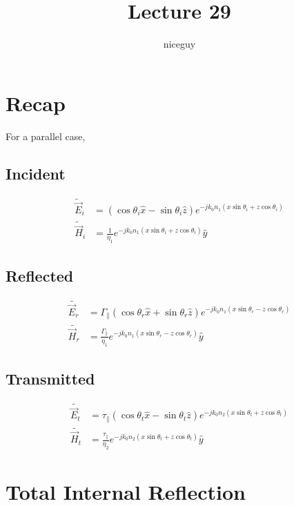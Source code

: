 \documentclass[12pt]{article}
\title{Lecture 29}
\author{niceguy}
\begin{document}
\maketitle

\section{Recap}

For a parallel case,

\subsection{Incident}

\begin{align*}
    \tilde{\vec E}_i &= (\cos\theta_i\hat x - \sin\theta_i\hat z)e^{-jk_0n_1(x\sin\theta_i + z\cos\theta_i)} \\
    \tilde{\vec H}_i &= \frac{1}{\eta_1}e^{-jk_0n_1(x\sin\theta_i + z\cos\theta_i)} \hat y
\end{align*}

\subsection{Reflected}

\begin{align*}
    \tilde{\vec E_r} &= \Gamma_\parallel (\cos\theta_r\hat x + \sin\theta_r\hat z)e^{-jk_0n_1(x\sin\theta_r - z\cos\theta_r)} \\
    \tilde{\vec H_r} &= \frac{\Gamma_\parallel}{\eta_1} e^{-jk_0n_1(x\sin\theta_r - z\cos\theta_r)} \hat y
\end{align*}

\subsection{Transmitted}

\begin{align*}
    \tilde{\vec E_t} &= \tau_\parallel(\cos\theta_t \hat x - \sin\theta_t\hat z)e^{-jk_0n_2(x\sin\theta_t + z\cos\theta_t)} \\
    \tilde{\vec H_t} &= \frac{\tau_\parallel}{\eta_2} e^{-jk_0n_2(x\sin\theta_t + z\cos\theta_t)} \hat y
\end{align*}

\section{Total Internal Reflection}
\end{document}
